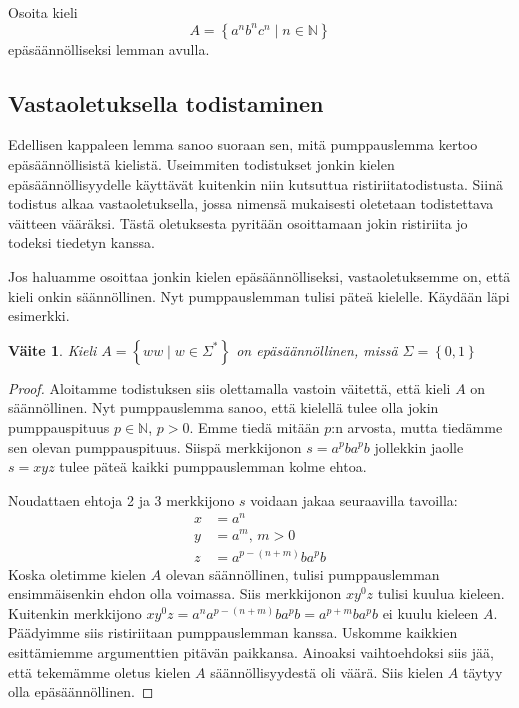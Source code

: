 \documentclass[a4paper,11pt]{article}
\newtheorem*{claim}{Väite}
\theoremstyle{definition}
\newcommand{\set}[1]{{\left\{ #1 \right\}}}
\newcommand{\Nat}{\mathbb{N}}
\begin{document}
\begin{exercise}
  Osoita kieli
  \begin{equation*}
      A = \set{a^nb^nc^n \mid n \in \Nat}
  \end{equation*}
  epäsäännölliseksi lemman avulla.
\end{exercise}

\subsection*{Vastaoletuksella todistaminen}

Edellisen kappaleen lemma sanoo suoraan sen, mitä pumppauslemma kertoo
epäsäännöllisistä kielistä. Useimmiten todistukset jonkin kielen
epäsäännöllisyydelle käyttävät kuitenkin niin kutsuttua ristiriitatodistusta.
Siinä todistus alkaa vastaoletuksella, jossa nimensä mukaisesti oletetaan
todistettava väitteen vääräksi. Tästä oletuksesta pyritään osoittamaan
jokin ristiriita jo todeksi tiedetyn kanssa.

Jos haluamme osoittaa jonkin kielen epäsäännölliseksi, vastaoletuksemme on,
että kieli onkin säännöllinen. Nyt pumppauslemman tulisi päteä kielelle.
Käydään läpi esimerkki.

\begin{claim}
    Kieli $A = \set{ww \mid w \in \Sigma^*}$ on epäsäännöllinen, missä $\Sigma
    = \set{0,1}$
\end{claim}
\begin{proof}
    Aloitamme todistuksen siis olettamalla vastoin väi\-tet\-tä, että kieli $A$ on
    säännöllinen. Nyt pumppauslemma sanoo, että kielellä tulee olla jokin
    pumppauspituus $p \in \Nat$, $p > 0$. Emme tiedä mitään $p$:n arvosta,
    mutta tiedämme sen olevan pumppauspituus. Siispä merkkijonon $s =
    a^pba^pb$ jollekkin jaolle $s = xyz$ tulee päteä kaikki pumppauslemman
    kolme ehtoa.

    Noudattaen ehtoja 2 ja 3 merkkijono $s$ voidaan jakaa seuraavilla tavoilla:
    \begin{align*}
        x & = a^n \\
        y & = a^m \text{, } m > 0 \\
        z & = a^{p-(n+m)}ba^pb
    \end{align*}
    Koska oletimme kielen $A$ olevan säännöllinen, tulisi pumppauslemman
    ensimmäisenkin ehdon olla voimassa. Siis merkkijonon $xy^0z$ tulisi kuulua
    kieleen. Kuitenkin merkkijono $xy^0z = a^na^{p-(n+m)}ba^pb = a^{p+m}ba^pb$ ei
    kuulu kieleen $A$. Päädyimme siis ristiriitaan pumppauslemman kanssa.
    Uskomme kaikkien esittämiemme argumenttien pitävän paikkansa.  Ainoaksi
    vaihtoehdoksi siis jää, että tekemämme oletus kielen $A$
    sään\-nöl\-li\-syy\-des\-tä oli väärä. Siis kielen $A$ täytyy olla
    epäsäännöllinen.
\end{proof}
\end{document}
